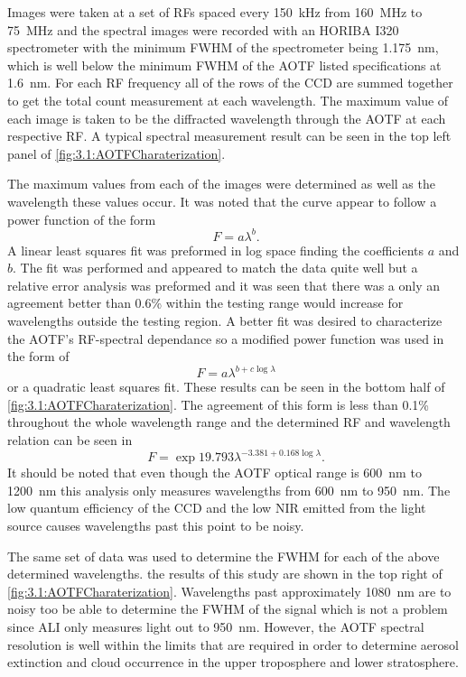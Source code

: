\documentclass[12pt]{article}
\begin{document}
Images were taken at a set of RFs spaced every 150~kHz from 160~MHz to 75~MHz and the spectral images were recorded with an HORIBA I320 spectrometer with the minimum FWHM of the spectrometer being 1.175~nm, which is well below the minimum FWHM of the AOTF listed specifications at 1.6~nm. For each RF frequency all of the rows of the CCD are summed together to get the total count measurement at each wavelength. The maximum value of each image is taken to be the diffracted wavelength through the AOTF at each respective RF. A typical spectral measurement result can be seen in the top left panel of \autoref{fig:3.1:AOTFCharaterization}. 

The maximum values from each of the images were determined as well as the wavelength these values occur. It was noted that the curve appear to follow a power function of the form
\begin{equation}
    \ F = a\lambda^{b}.
    \label{eqn:3.1:powerFunction}
\end{equation}
A linear least squares fit was preformed in log space finding the coefficients $a$ and $b$. The fit was performed and appeared to match the data quite well but a relative error analysis was preformed and it was seen that there was a only an agreement better than 0.6\% within the testing range would increase for wavelengths outside the testing region. A better fit was desired to characterize the AOTF's RF-spectral dependance so a modified power function was used in the form of
 \begin{equation}
    \ F = a\lambda^{b+c\log\lambda}
    \label{eqn:3.1:modifiedPowerFunction}
\end{equation}
or a quadratic least squares fit. These results can be seen in the bottom half of \autoref{fig:3.1:AOTFCharaterization}. The agreement of this form is less than 0.1\% throughout the whole wavelength range and the determined RF and wavelength relation can be seen in
\begin{equation}
    \ F = \exp{19.793}\lambda^{-3.381+0.168\log\lambda}.
    \label{eqn:3.1:modifiedPowerFunctionCoeffiecicents}
\end{equation}
It should be noted that even though the AOTF optical range is 600~nm to 1200~nm this analysis only measures wavelengths from 600~nm to 950~nm. The low quantum efficiency of the CCD and the low NIR emitted from the light source causes wavelengths past this point to be noisy. 

The same set of data was used to determine the FWHM for each of the above determined wavelengths. the results of this study are shown in the top right of \autoref{fig:3.1:AOTFCharaterization}. Wavelengths past approximately 1080~nm are to noisy too be able to determine the FWHM of the signal which is not a problem since ALI only measures light out to 950~nm. However, the AOTF spectral resolution is well within the limits that are required in order to determine aerosol extinction and cloud occurrence in the upper troposphere and lower stratosphere.
\end{document}
